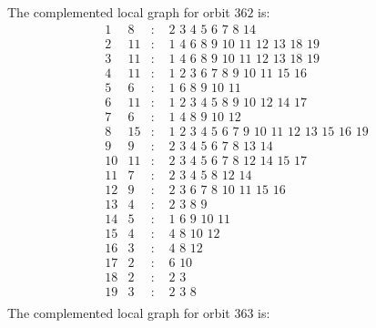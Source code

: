 \documentclass[12pt]{article}
\begin{document}
The complemented local graph for orbit $362$ is:
\begin{equation*}
\begin{array}{rrcl}
1&8&:&\,\,2\,\,3\,\,4\,\,5\,\,6\,\,7\,\,8\,\,14\\
2&11&:&\,\,1\,\,4\,\,6\,\,8\,\,9\,\,10\,\,11\,\,12\,\,13\,\,18\,\,19\\
3&11&:&\,\,1\,\,4\,\,6\,\,8\,\,9\,\,10\,\,11\,\,12\,\,13\,\,18\,\,19\\
4&11&:&\,\,1\,\,2\,\,3\,\,6\,\,7\,\,8\,\,9\,\,10\,\,11\,\,15\,\,16\\
5&6&:&\,\,1\,\,6\,\,8\,\,9\,\,10\,\,11\\
6&11&:&\,\,1\,\,2\,\,3\,\,4\,\,5\,\,8\,\,9\,\,10\,\,12\,\,14\,\,17\\
7&6&:&\,\,1\,\,4\,\,8\,\,9\,\,10\,\,12\\
8&15&:&\,\,1\,\,2\,\,3\,\,4\,\,5\,\,6\,\,7\,\,9\,\,10\,\,11\,\,12\,\,13\,\,15\,\,16\,\,19\\
9&9&:&\,\,2\,\,3\,\,4\,\,5\,\,6\,\,7\,\,8\,\,13\,\,14\\
10&11&:&\,\,2\,\,3\,\,4\,\,5\,\,6\,\,7\,\,8\,\,12\,\,14\,\,15\,\,17\\
11&7&:&\,\,2\,\,3\,\,4\,\,5\,\,8\,\,12\,\,14\\
12&9&:&\,\,2\,\,3\,\,6\,\,7\,\,8\,\,10\,\,11\,\,15\,\,16\\
13&4&:&\,\,2\,\,3\,\,8\,\,9\\
14&5&:&\,\,1\,\,6\,\,9\,\,10\,\,11\\
15&4&:&\,\,4\,\,8\,\,10\,\,12\\
16&3&:&\,\,4\,\,8\,\,12\\
17&2&:&\,\,6\,\,10\\
18&2&:&\,\,2\,\,3\\
19&3&:&\,\,2\,\,3\,\,8\\
\end{array}
\end{equation*}
The complemented local graph for orbit $363$ is:
\end{document}
